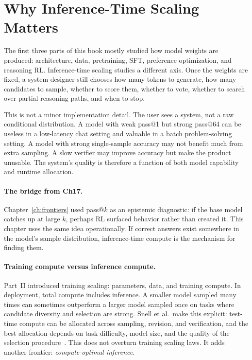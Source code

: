 \section{Why Inference-Time Scaling Matters}
\label{sec:ch18-why}

The first three parts of this book mostly studied how model weights are produced: architecture, data, pretraining, SFT, preference optimization, and reasoning RL. Inference-time scaling studies a different axis. Once the weights are fixed, a system designer still chooses how many tokens to generate, how many candidates to sample, whether to score them, whether to vote, whether to search over partial reasoning paths, and when to stop.

This is not a minor implementation detail. The user sees a system, not a raw conditional distribution. A model with weak pass@1 but strong pass@64 can be useless in a low-latency chat setting and valuable in a batch problem-solving setting. A model with strong single-sample accuracy may not benefit much from extra sampling. A slow verifier may improve accuracy but make the product unusable. The system's quality is therefore a function of both model capability and runtime allocation.

\paragraph{The bridge from Ch17.} Chapter~\ref{ch:frontiers} used pass@$k$ as an epistemic diagnostic: if the base model catches up at large $k$, perhaps RL surfaced behavior rather than created it. This chapter uses the same idea operationally. If correct answers exist somewhere in the model's sample distribution, inference-time compute is the mechanism for finding them.

\paragraph{Training compute versus inference compute.} Part~II introduced training scaling: parameters, data, and training compute. In deployment, total compute includes inference. A smaller model sampled many times can sometimes outperform a larger model sampled once on tasks where candidate diversity and selection are strong. Snell et al.\ make this explicit: test-time compute can be allocated across sampling, revision, and verification, and the best allocation depends on task difficulty, model size, and the quality of the selection procedure~\cite{snell2024scaling}. This does not overturn training scaling laws. It adds another frontier: \emph{compute-optimal inference}.

